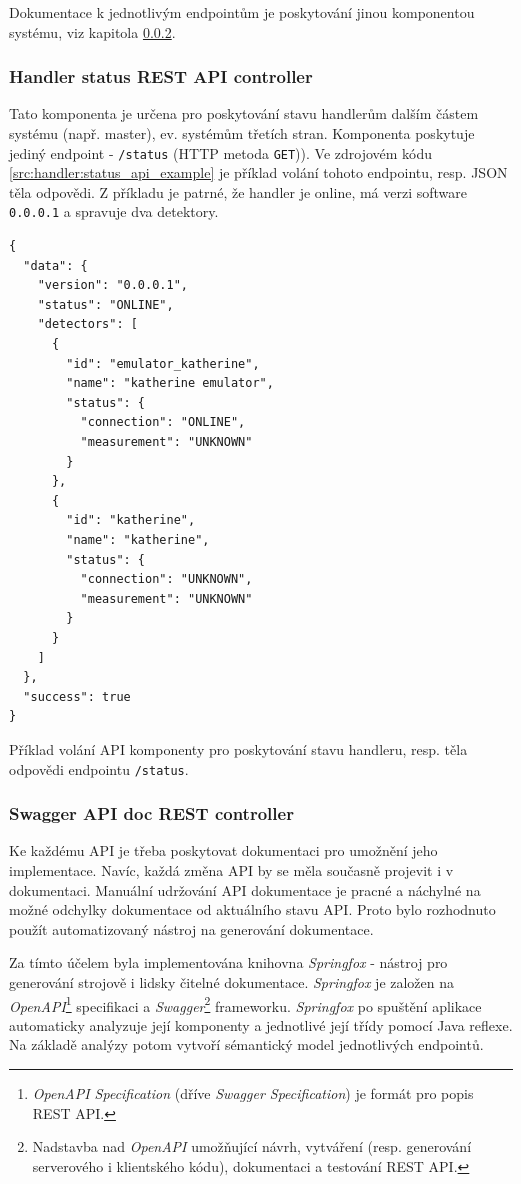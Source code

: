 Dokumentace k jednotlivým endpointům je poskytování jinou komponentou systému, viz kapitola \ref{chap:handler:spring:swagger}.

\subsubsection{Handler status REST API controller}\label{chap:handler:spring:status_api}
Tato komponenta je určena pro poskytování stavu handlerům dalším částem systému (např. master), ev. systémům třetích stran. Komponenta poskytuje jediný endpoint - \texttt{/status} (HTTP metoda \texttt{GET})). Ve zdrojovém kódu \ref{src:handler:status_api_example} je příklad volání tohoto endpointu, resp. JSON těla odpovědi. Z příkladu je patrné, že handler je online, má verzi software \texttt{0.0.0.1} a spravuje dva detektory.

\begin{code}[h!]
  \begin{verbatim}
{
  "data": {
    "version": "0.0.0.1",
    "status": "ONLINE",
    "detectors": [
      {
        "id": "emulator_katherine",
        "name": "katherine emulator",
        "status": {
          "connection": "ONLINE",
          "measurement": "UNKNOWN"
        }
      },
      {
        "id": "katherine",
        "name": "katherine",
        "status": {
          "connection": "UNKNOWN",
          "measurement": "UNKNOWN"
        }
      }
    ]
  },
  "success": true
}
\end{verbatim}
\caption{Příklad volání API komponenty pro poskytování stavu handleru, resp. těla odpovědi endpointu \texttt{/status}.}
\label{src:handler:status_api_example}
\end{code}


\subsubsection{Swagger API doc REST controller}\label{chap:handler:spring:swagger}
Ke každému API je třeba poskytovat dokumentaci pro umožnění jeho implementace. Navíc, každá změna API by se měla současně projevit i v dokumentaci. Manuální udržování API dokumentace je pracné a náchylné na možné odchylky dokumentace od aktuálního stavu API. Proto bylo rozhodnuto použít automatizovaný nástroj na generování dokumentace.

Za tímto účelem byla implementována knihovna \textit{Springfox} \cite{springfox} - nástroj pro generování strojově i lidsky čitelné dokumentace. \textit{Springfox} je založen na \textit{OpenAPI}\footnote{\textit{OpenAPI Specification} (dříve \textit{Swagger Specification}) je formát pro popis REST API.} specifikaci a \textit{Swagger}\footnote{Nadstavba nad \textit{OpenAPI} umožňující návrh, vytváření (resp. generování serverového i klientského kódu), dokumentaci a testování REST API.} frameworku. \textit{Springfox} po spuštění aplikace automaticky analyzuje její komponenty a jednotlivé její třídy pomocí Java reflexe. Na základě analýzy potom vytvoří sémantický model jednotlivých endpointů.

